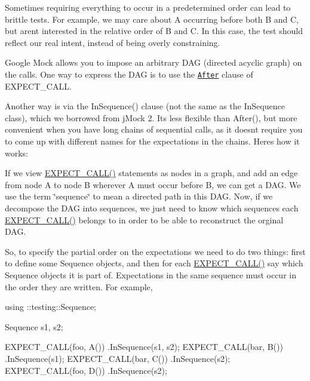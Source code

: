 Sometimes requiring everything to occur in a predetermined order can lead to brittle tests. For example, we may care about {\ttfamily A} occurring before both {\ttfamily B} and {\ttfamily C}, but aren\textquotesingle{}t interested in the relative order of {\ttfamily B} and {\ttfamily C}. In this case, the test should reflect our real intent, instead of being overly constraining.

Google Mock allows you to impose an arbitrary D\+AG (directed acyclic graph) on the calls. One way to express the D\+AG is to use the \href{http://code.google.com/p/googlemock/wiki/V1_6_CheatSheet#The_After_Clause}{\tt After} clause of {\ttfamily E\+X\+P\+E\+C\+T\+\_\+\+C\+A\+LL}.

Another way is via the {\ttfamily In\+Sequence()} clause (not the same as the {\ttfamily In\+Sequence} class), which we borrowed from j\+Mock 2. It\textquotesingle{}s less flexible than {\ttfamily After()}, but more convenient when you have long chains of sequential calls, as it doesn\textquotesingle{}t require you to come up with different names for the expectations in the chains. Here\textquotesingle{}s how it works\+:

If we view {\ttfamily \hyperlink{gmock-spec-builders_8h_a535a6156de72c1a2e25a127e38ee5232}{E\+X\+P\+E\+C\+T\+\_\+\+C\+A\+L\+L()}} statements as nodes in a graph, and add an edge from node A to node B wherever A must occur before B, we can get a D\+AG. We use the term \char`\"{}sequence\char`\"{} to mean a directed path in this D\+AG. Now, if we decompose the D\+AG into sequences, we just need to know which sequences each {\ttfamily \hyperlink{gmock-spec-builders_8h_a535a6156de72c1a2e25a127e38ee5232}{E\+X\+P\+E\+C\+T\+\_\+\+C\+A\+L\+L()}} belongs to in order to be able to reconstruct the orginal D\+AG.

So, to specify the partial order on the expectations we need to do two things\+: first to define some {\ttfamily Sequence} objects, and then for each {\ttfamily \hyperlink{gmock-spec-builders_8h_a535a6156de72c1a2e25a127e38ee5232}{E\+X\+P\+E\+C\+T\+\_\+\+C\+A\+L\+L()}} say which {\ttfamily Sequence} objects it is part of. Expectations in the same sequence must occur in the order they are written. For example,


\begin{DoxyCode}
using ::testing::Sequence;

Sequence s1, s2;

EXPECT\_CALL(foo, A())
    .InSequence(s1, s2);
EXPECT\_CALL(bar, B())
    .InSequence(s1);
EXPECT\_CALL(bar, C())
    .InSequence(s2);
EXPECT\_CALL(foo, D())
    .InSequence(s2);
\end{DoxyCode}


